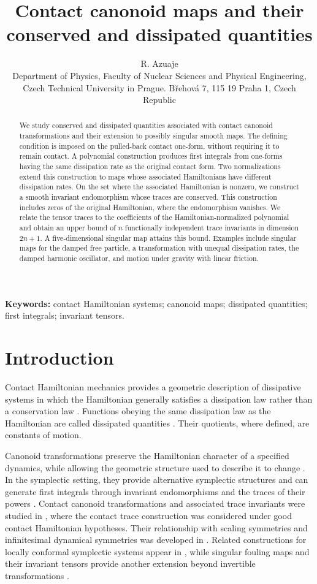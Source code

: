 \documentclass[11pt,a4paper]{article}
\title{Contact canonoid maps and their conserved and dissipated quantities}
\author{R. Azuaje\\
Department of Physics, Faculty of Nuclear Sciences and Physical Engineering,\\
Czech Technical University in Prague. Břehová 7, 115 19 Praha 1, Czech Republic}
\date{}
\numberwithin{equation}{section}
\theoremstyle{definition}
\theoremstyle{remark}
\begin{document}
\maketitle

\begin{abstract}
We study conserved and dissipated quantities associated with contact
canonoid transformations and their extension to possibly singular smooth
maps. The defining condition is imposed on the pulled-back contact
one-form, without requiring it to remain contact. A polynomial
construction produces first integrals from one-forms having the same
dissipation rate as the original contact form. Two normalizations extend
this construction to maps whose associated Hamiltonians have different
dissipation rates. On the set where the associated Hamiltonian is nonzero,
we construct a smooth invariant endomorphism whose traces
are conserved. This construction includes zeros of the
original Hamiltonian, where the endomorphism vanishes. We relate the tensor traces to the coefficients of the
Hamiltonian-normalized polynomial and obtain an upper bound of
$n$ functionally independent trace invariants in dimension
$2n+1$. A five-dimensional singular map attains this bound. Examples include
singular maps for the damped free particle, a transformation with unequal
dissipation rates, the damped harmonic oscillator, and motion under
gravity with linear friction.
\end{abstract}

\noindent\textbf{Keywords:} contact Hamiltonian systems; canonoid maps;
dissipated quantities; first integrals; invariant tensors.

\section{Introduction}

Contact Hamiltonian mechanics provides a geometric description of
dissipative systems in which the Hamiltonian generally satisfies a dissipation law rather than a conservation law
\cite{LL2019,LS2017,BCT2017,GGMRR2020,GLR2022}. Functions obeying the same dissipation law
as the Hamiltonian are called dissipated quantities \cite{BG2021,GGMRR2020,LL2020}. Their quotients,
where defined, are constants of motion.

Canonoid transformations preserve the Hamiltonian character of a specified dynamics, while allowing the geometric structure used to describe it to change \cite{CR88,CR89,CFR2013}. In the symplectic setting, they provide alternative
symplectic structures and can generate first integrals
through invariant endomorphisms and the traces of
their powers \cite{carinena2024geometric}. Contact canonoid transformations and associated trace
invariants were studied in \cite{azuaje2023canonical}, where the contact trace construction was considered under good contact Hamiltonian
hypotheses. Their relationship with scaling symmetries and
infinitesimal dynamical symmetries was developed in
\cite{azuaje2024scaling}. Related constructions for locally conformal
symplectic systems appear in \cite{azuaje2026canonical}, while singular fouling maps and their invariant tensors provide
another extension beyond invertible transformations
\cite{azuaje2026fouling}.
\end{document}
